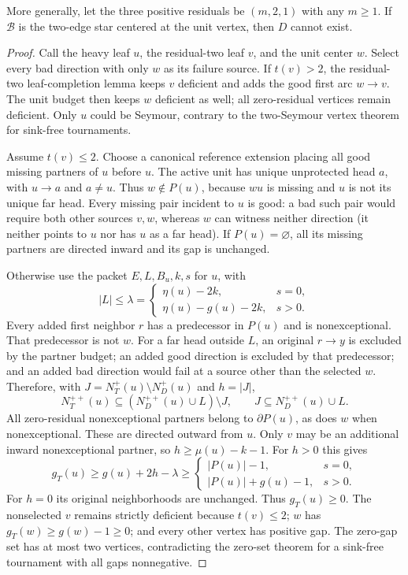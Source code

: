 \begin{lemma}
\label{lem:unit-centered-star-arbitrary-heavy}
More generally, let the three positive residuals be $(m,2,1)$ with
any $m\ge1$.  If $\mathcal B$ is the two-edge star centered at the
unit vertex, then $D$ cannot exist.
\end{lemma}
\begin{proof}
Call the heavy leaf $u$, the residual-two leaf $v$, and the unit
center $w$.  Select every bad direction with only $w$ as its failure
source.  If $t(v)>2$, the residual-two leaf-completion lemma keeps
$v$ deficient and adds the good first arc $w\to v$.  The unit budget
then keeps $w$ deficient as well; all zero-residual vertices remain
deficient.  Only $u$ could be Seymour, contrary to the two-Seymour
vertex theorem for sink-free tournaments.

Assume $t(v)\le2$.  Choose a canonical reference extension placing
all good missing partners of $u$ before $u$.  The active unit has
unique unprotected head $a$, with $u\to a$ and $a\ne u$.  Thus
$w\notin P(u)$, because $wu$ is missing and $u$ is not its unique
far head.  Every missing pair incident to $u$ is good: a bad such
pair would require both other sources $v,w$, whereas $w$ can witness
neither direction (it neither points to $u$ nor has $u$ as a far
head).  If $P(u)=\varnothing$, all its missing partners are directed
inward and its gap is unchanged.

Otherwise use the packet $E,L,B_u,k,s$ for $u$, with
\[
 |L|\le\lambda=
 \begin{cases}\eta(u)-2k,&s=0,\\
 \eta(u)-g(u)-2k,&s>0.\end{cases}
\]
Every added first neighbor $r$ has a predecessor in $P(u)$ and is
nonexceptional.  That predecessor is not $w$.  For a far head outside
$L$, an original $r\to y$ is excluded by the partner budget; an added
good direction is excluded by that predecessor; and an added bad
direction would fail at a source other than the selected $w$.
Therefore, with $J=N_T^+(u)\setminus N_D^+(u)$ and $h=|J|$,
\[
 N_T^{++}(u)\subseteq (N_D^{++}(u)\cup L)\setminus J,
 \qquad J\subseteq N_D^{++}(u)\cup L.
\]
All zero-residual nonexceptional partners belong to $\partial P(u)$,
as does $w$ when nonexceptional.  These are directed outward from
$u$.  Only $v$ may be an additional inward nonexceptional partner,
so $h\ge\mu(u)-k-1$.  For $h>0$ this gives
\[
 g_T(u)\ge g(u)+2h-\lambda\ge
 \begin{cases}|P(u)|-1,&s=0,\\
 |P(u)|+g(u)-1,&s>0.\end{cases}
\]
For $h=0$ its original neighborhoods are unchanged.  Thus $g_T(u)\ge0$.
The nonselected $v$ remains strictly deficient because $t(v)\le2$;
$w$ has $g_T(w)\ge g(w)-1\ge0$; and every other vertex has positive
gap.  The zero-gap set has at most two vertices, contradicting the
zero-set theorem for a sink-free tournament with all gaps nonnegative.
\end{proof}

